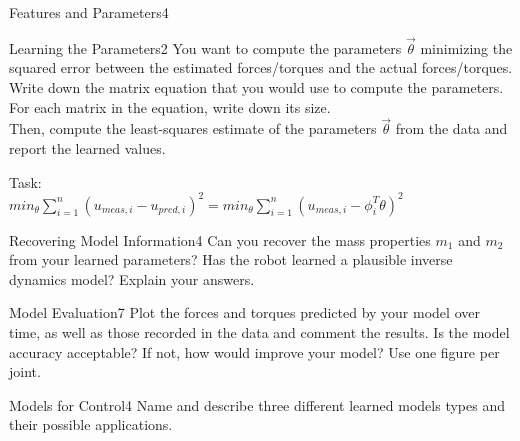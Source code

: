 \begin{questions}
\begin{question}{Features and Parameters}{4}
\begin{answer}
	\end{answer}

\end{question}



\begin{question}{Learning the Parameters}{2}
You want to compute the parameters $\vec{\theta}$ minimizing the squared error between the estimated forces/torques and the actual forces/torques.
Write down the matrix equation that you would use to compute the parameters. For each matrix in the equation, write down its size.\\
Then, compute the least-squares estimate of the parameters $\vec{\theta}$ from the data and report the learned values.

\begin{answer}
	
	Task:\\
	$min_{\theta} \sum_{i=1}^n (u_{meas,i}-u_{pred,i})^2 =min_{\theta} \sum_{i=1}^n (u_{meas,i}-\phi^T_i \theta)^2 $
	
	
	\end{answer}

\end{question}



\begin{question}{Recovering Model Information}{4}
	Can you recover the mass properties $m_{1}$ and $m_{2}$ from your learned parameters? Has the robot learned a plausible inverse dynamics model? Explain your answers.
	
\begin{answer}\end{answer}
\end{question}



\begin{question}{Model Evaluation}{7}
Plot the forces and torques predicted by your model over time, as well as those recorded in the data and comment the results. Is the model accuracy acceptable? If not, how would improve your model? Use one figure per joint.

\begin{answer}\end{answer}

\end{question}



\begin{question}[bonus]{Models for Control}{4}
Name and describe three different learned models types and their possible applications.

\begin{answer}\end{answer}

\end{question}


\end{questions}

